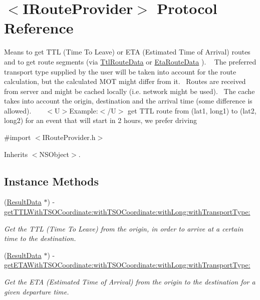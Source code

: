 \hypertarget{protocol_i_route_provider-p}{}\section{$<$I\+Route\+Provider$>$ Protocol Reference}
\label{protocol_i_route_provider-p}


Means to get T\+T\+L (Time To Leave) or E\+T\+A (Estimated Time of Arrival) routes and to get route segments (via \hyperlink{interface_ttl_route_data}{Ttl\+Route\+Data} or \hyperlink{interface_eta_route_data}{Eta\+Route\+Data} ). ~\newline
 The preferred transport type supplied by the user will be taken into account for the route calculation, but the calculated M\+O\+T might differ from it.~\newline
 Routes are received from server and might be cached locally (i.\+e. network might be used).~\newline
 The cache takes into account the origin, destination and the arrival time (some difference is allowed). ~\newline
 ~\newline
 $<$\+U$>$Example\+:$<$/\+U$>$ get T\+T\+L route from (lat1, long1) to (lat2, long2) for an event that will start in 2 hours, we prefer driving ~\newline
 ~\newline
  




{\ttfamily \#import $<$I\+Route\+Provider.\+h$>$}



Inherits $<$\+N\+S\+Object$>$.

\subsection*{Instance Methods}
\begin{DoxyCompactItemize}
\item 
(\hyperlink{interface_result_data}{Result\+Data} $\ast$) -\/ \hyperlink{protocol_i_route_provider-p_afe4c9350635e2be3fbd6c857061f58d1}{get\+T\+T\+L\+With\+T\+S\+O\+Coordinate\+:with\+T\+S\+O\+Coordinate\+:with\+Long\+:with\+Transport\+Type\+:}
\begin{DoxyCompactList}\small\item\em Get the T\+T\+L (Time To Leave) from the origin, in order to arrive at a certain time to the destination. \end{DoxyCompactList}\item 
(\hyperlink{interface_result_data}{Result\+Data} $\ast$) -\/ \hyperlink{protocol_i_route_provider-p_a0046766facf8401163ef3358a513d899}{get\+E\+T\+A\+With\+T\+S\+O\+Coordinate\+:with\+T\+S\+O\+Coordinate\+:with\+Long\+:with\+Transport\+Type\+:}
\begin{DoxyCompactList}\small\item\em Get the E\+T\+A (Estimated Time of Arrival) from the origin to the destination for a given departure time. \end{DoxyCompactList}\end{DoxyCompactItemize}


